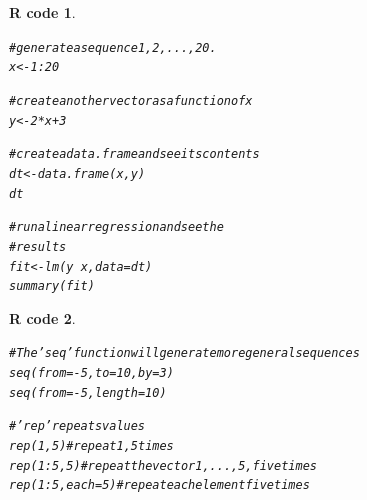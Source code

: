 \documentclass[11pt]{beamer}\usepackage[]{graphicx}\usepackage[]{color}
\makeatletter
\newcommand{\hlnum}[1]{\textcolor[rgb]{0.063,0.58,0.627}{#1}}%
\newcommand{\hlcom}[1]{\textcolor[rgb]{0.588,0.588,0.588}{#1}}%
\newcommand{\hlopt}[1]{\textcolor[rgb]{0.196,0.196,0.196}{#1}}%
\newcommand{\hlstd}[1]{\textcolor[rgb]{0.196,0.196,0.196}{#1}}%
\newcommand{\hlkwb}[1]{\textcolor[rgb]{0.627,0,0.314}{#1}}%
\newcommand{\hlkwc}[1]{\textcolor[rgb]{0,0.631,0.314}{#1}}%
\newcommand{\hlkwd}[1]{\textcolor[rgb]{0.78,0.227,0.412}{#1}}%
\newenvironment{kframe}{%
 \def\at@end@of@kframe{}%
 \ifinner\ifhmode%
  \def\at@end@of@kframe{\end{minipage}}%
  \begin{minipage}{\columnwidth}%
 \fi\fi%
 \def\FrameCommand##1{\hskip\@totalleftmargin \hskip-\fboxsep
 \colorbox{shadecolor}{##1}\hskip-\fboxsep
     \hskip-\linewidth \hskip-\@totalleftmargin \hskip\columnwidth}%
 \MakeFramed {\advance\hsize-\width
   \@totalleftmargin\z@ \linewidth\hsize
   \@setminipage}}%
 {\par\unskip\endMakeFramed%
 \at@end@of@kframe}
\newenvironment{knitrout}{}{} %
\newtheorem{rcode}{R code}[section]
\makeatother
\begin{document}
\begin{frame}
\begin{knitrout}
\color{fgcolor}\begin{kframe}
\begin{rcode}\label{unnamed-chunk-6}\begin{alltt}
\hlcom{# generate a sequence 1, 2, ..., 20.}
\hlstd{x} \hlkwb{<-} \hlnum{1}\hlopt{:}\hlnum{20}

\hlcom{# create another vector as a function of x}
\hlstd{y} \hlkwb{<-} \hlnum{2} \hlopt{*} \hlstd{x} \hlopt{+} \hlnum{3}

\hlcom{# create a data.frame and see its contents}
\hlstd{dt} \hlkwb{<-} \hlkwd{data.frame}\hlstd{(x, y)}
\hlstd{dt}

\hlcom{# run a linear regression and see the }
\hlcom{# results}
\hlstd{fit} \hlkwb{<-} \hlkwd{lm}\hlstd{(y} \hlopt{~} \hlstd{x,} \hlkwc{data} \hlstd{= dt)}
\hlkwd{summary}\hlstd{(fit)}
\end{alltt}
\end{rcode}\end{kframe}
\end{knitrout}
\end{frame}

\endgroup


\begin{frame}
\begin{knitrout}
\color{fgcolor}\begin{kframe}
\begin{rcode}\label{unnamed-chunk-7}\begin{alltt}
\hlcom{# The ’seq’ function will generate more general sequences }
\hlkwd{seq}\hlstd{(}\hlkwc{from} \hlstd{=} \hlopt{-}\hlnum{5}\hlstd{,} \hlkwc{to} \hlstd{=} \hlnum{10}\hlstd{,} \hlkwc{by} \hlstd{=} \hlnum{3}\hlstd{)}
\hlkwd{seq}\hlstd{(}\hlkwc{from} \hlstd{=} \hlopt{-}\hlnum{5}\hlstd{,} \hlkwc{length} \hlstd{=} \hlnum{10}\hlstd{)}

\hlcom{#’rep’ repeats values}
\hlkwd{rep}\hlstd{(}\hlnum{1}\hlstd{,} \hlnum{5}\hlstd{)} \hlcom{# repeat 1, 5 times}
\hlkwd{rep}\hlstd{(}\hlnum{1}\hlopt{:}\hlnum{5}\hlstd{,} \hlnum{5}\hlstd{)} \hlcom{# repeat the vector 1,...,5,  five times}
\hlkwd{rep}\hlstd{(}\hlnum{1}\hlopt{:}\hlnum{5}\hlstd{,} \hlkwc{each} \hlstd{=} \hlnum{5}\hlstd{)} \hlcom{# repeat each element five times}
\end{alltt}
\end{rcode}\end{kframe}
\end{knitrout}
\end{frame}
\end{document}
